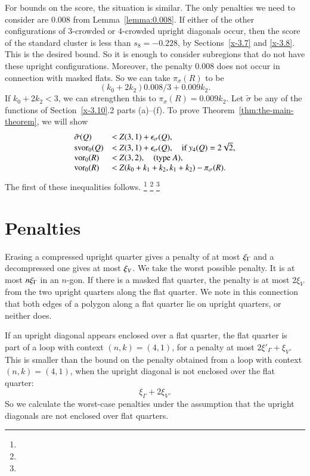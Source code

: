 For bounds on the score, the situation is similar.  The only
penalties we need to consider are $0.008$ from
Lemma~\ref{lemma:0.008}. If either of the other configurations of
$3$-crowded or $4$-crowded upright diagonals occur, then the score
of the standard cluster is less than $s_8=-0.228$, by
Sections~\ref{x-3.7} and \ref{x-3.8}. This is the desired bound.
So it is enough to consider subregions that do not have these
upright configurations. Moreover, the penalty $0.008$ does not
occur in connection with masked flats. So we can take
$\pi_\sigma(R)$ to be
    $$(k_0+2k_2)0.008/3 + 0.009 k_2.$$
If $k_0+2k_2<3$, we can strengthen this to
    $\pi_\sigma(R)=0.009 k_2$.
Let $\tilde\sigma$ be any of the functions of Section~\ref{x-3.10}.2
parts (a)--(f). To prove Theorem~\ref{thm:the-main-theorem}, we will
show
    \begin{equation}
    \begin{array}{lll}
    \tilde\sigma(Q)&< Z(3,1)+\epsilon_\sigma(Q),\\
    \operatorname{svor}_0(Q)&< Z(3,1)+\epsilon_\sigma(Q),\quad\text{if }y_4(Q)=2\sqrt2,\\
    \operatorname{vor}_0(R)&< Z(3,2),\quad\text{(type $A$)},\\
    \operatorname{vor}_0(R) &< Z(k_0+k_1+k_2,k_1+k_2) - \pi_\sigma(R).
    \label{eqn:sigma<Z(n,k)}
    \end{array}
    \end{equation}
The first of these inequalities follows.%
\footnote{} %
\footnote{} %
\footnote{} %


\section{Penalties} %
\label{sec:4.2} \label{sec:penalty}

Erasing a compressed upright quarter gives a penalty of
at most $\xi_\Gamma$ and a decompressed one gives at most $\xi_V$. We
take the worst possible penalty.  It is at most $n\xi_\Gamma$ in an
$n$-gon. If there is a masked flat quarter, the penalty is at most
$2\xi_V$ from the two upright quarters along the flat quarter.  We
note in this connection that both edges of a polygon along a flat
quarter lie on upright quarters, or neither does.

If an upright diagonal appears enclosed over a flat quarter, the
flat quarter is part of a loop with context $(n,k)=(4,1)$, for a
penalty at most $2\xi'_\Gamma+\xi_V$.  This is smaller than the
bound on the penalty obtained from a loop with context
$(n,k)=(4,1)$, when the upright diagonal is not enclosed over the
flat quarter:
    $$\xi_\Gamma + 2\xi_V.$$
So we calculate the worst-case penalties under the assumption that
the upright diagonals are not enclosed over flat quarters.

